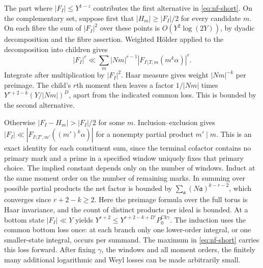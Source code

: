 \documentclass[11pt,letterpaper]{article}
\theoremstyle{definition}
\numberwithin{equation}{section}
\begin{document}
The part where $|F_I|\le Y^{1-z}$ contributes the first alternative
in \eqref{eq:nf-short}. On the complementary set, suppose first that
$|H_m|\ge |F_I|/2$ for every candidate $m$. On each fibre the sum
of $|F_I|^2$ over these points is $O(Y^2\log(2Y))$, by dyadic
decomposition and the fibre assertion. Weighted H\"older applied to
the decomposition into children gives
\[
 |F_I|^r\ll\sum_m |Nm|^{r-1}|F_{I\setminus T,m}(m^k\alpha)|^r .
\]
Integrate after multiplication by $|F_I|^2$. Haar measure gives
weight $|Nm|^{-k}$ per preimage. The child's $r$th moment then
leaves a factor $1/|Nm|$ times
$Y^{r+2-k}(Y/|Nm|)^D$, apart from the indicated common loss.
This is bounded by the second alternative.

Otherwise $|F_I-H_m|>|F_I|/2$ for some $m$. Inclusion--exclusion
gives $|F_I|\ll |F_{I\setminus T',m'}((m')^k\alpha)|$ for a
nonempty partial product $m'\mid m$. This is an exact identity for
each constituent sum, since the terminal cofactor contains no primary
mark and a prime in a specified window uniquely fixes that primary
choice. The implied constant depends only on the number of windows.
Induct at the same moment order on the number of remaining marks.
In summing over possible partial products the net factor is bounded
by $\sum_{\mathfrak a}(N\mathfrak a)^{k-r-2}$, which converges since
$r+2-k\ge2$.
Here the preimage formula over the full torus is Haar invariance, and
the count of distinct products per ideal is bounded. At a bottom
state $|F_I|\ll Y$ yields $Y^{r+2}\le
Y^{r+2-k+D'}P_0^{Ck\gamma}$. The induction uses the common bottom
loss once: at each branch only one lower-order integral, or one
smaller-state integral, occurs per summand. The maximum in
\eqref{eq:nf-short} carries this loss forward. After fixing
$\gamma$, the windows and all moment orders, the finitely many
additional logarithmic and Weyl losses can be made arbitrarily small.
\end{document}
